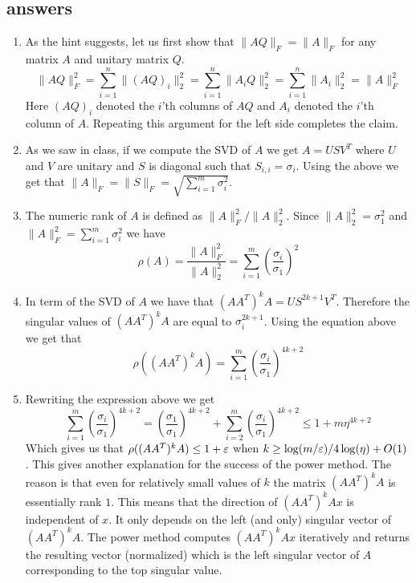 \subsection*{answers}
\begin{enumerate}
\item As the hint suggests, let us first show that $\|AQ\|_{F} = \|A\|_{F}$ for any matrix $A$ and unitary matrix $Q$.
\[
\|AQ\|^2_{F} = \sum_{i=1}^{n} \|(AQ)_i\|^2_2 = \sum_{i=1}^{n} \|A_iQ\|^2_2 = \sum_{i=1}^{n} \|A_i\|^2_2 = \|A\|^2_F
\]
Here $(AQ)_i$ denoted the $i$'th columns of $AQ$ and $A_i$ denoted the $i$'th column of $A$. Repeating this argument for the left side completes the claim.
\item As we saw in class, if we compute the SVD of $A$ we get $A = USV^T$ where $U$ and $V$ are unitary and $S$ is diagonal such that $S_{i,i} = \sigma_i$.
Using the above we get that $\|A\|_F = \|S\|_F = \sqrt{\sum_{i=1}^{m}\sigma_{i}^{2}}$.
\item The numeric rank of $A$ is defined as $\|A\|_F^2/\|A\|_2^2$. Since $\|A\|_2^2 = \sigma_1^2$ and $\|A\|_F^2 = \sum_{i=1}^{m}\sigma_{i}^{2}$ we have
\[
\rho(A) = \frac{\|A\|_F^2}{\|A\|_2^2} = \sum_{i=1}^{m}(\frac{\sigma_{i}}{\sigma_1})^{2}
\]
\item In term of the SVD of $A$ we have that $(AA^T)^{k}A = US^{2k+1}V^T$. 
Therefore the singular values of $(AA^T)^{k}A$ are equal to $\sigma_i^{2k+1}$.
Using the equation above we get that
\[
\rho((AA^T)^{k}A)  = \sum_{i=1}^{m}(\frac{\sigma_{i}}{\sigma_1})^{4k+2}
\]
\item Rewriting the expression above we get
\[
\sum_{i=1}^{m}(\frac{\sigma_{i}}{\sigma_1})^{4k+2} = (\frac{\sigma_{1}}{\sigma_1})^{4k+2} + \sum_{i=2}^{m}(\frac{\sigma_{i}}{\sigma_1})^{4k+2} \le 1+ m\eta^{4k+2}
\]
Which gives us that $\rho((AA^T)^{k}A) \le 1+\varepsilon$ when $k \ge \log(m/\varepsilon)/4\log(\eta) + O(1)$.
This gives another explanation for the success of the power method. 
The reason is that even for relatively small values of $k$ the matrix $(AA^T)^{k}A$ is essentially rank $1$. 
This means that the direction of $(AA^T)^{k}Ax$ is independent of $x$.
It only depends on the left (and only) singular vector of $(AA^T)^{k}A$.
The power method computes $(AA^T)^{k}Ax$ iteratively and returns the resulting vector (normalized) which is the left singular vector of $A$ corresponding to the top singular value. 

\end{enumerate}






















